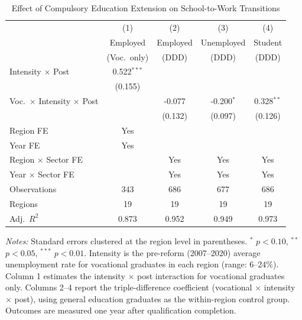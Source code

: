\begin{table}[H]
\centering
\caption{Effect of Compulsory Education Extension on School-to-Work Transitions}
\label{tab:main}
\begin{threeparttable}
\begin{tabular}{lcccc}
\toprule
 & (1) & (2) & (3) & (4) \\
 & Employed & Employed & Unemployed & Student \\
 & (Voc.~only) & (DDD) & (DDD) & (DDD) \\
\midrule
Intensity $\times$ Post & 0.522$^{***}$ & & & \\
 & (0.155) & & & \\
\addlinespace
Voc.~$\times$ Intensity $\times$ Post & & -0.077 & -0.200$^{*}$ & 0.328$^{**}$ \\
 & & (0.132) & (0.097) & (0.126) \\
\addlinespace
\midrule
Region FE & Yes & & & \\
Year FE & Yes & & & \\
Region $\times$ Sector FE & & Yes & Yes & Yes \\
Year $\times$ Sector FE & & Yes & Yes & Yes \\
Observations & 343 & 686 & 677 & 686 \\
Regions & 19 & 19 & 19 & 19 \\
Adj.~$R^2$ & 0.873 & 0.952 & 0.949 & 0.973 \\
\bottomrule
\end{tabular}
\begin{tablenotes}[flushleft]
\small
\item \textit{Notes:} Standard errors clustered at the region level in parentheses. $^{*}$ $p<0.10$, $^{**}$ $p<0.05$, $^{***}$ $p<0.01$. Intensity is the pre-reform (2007--2020) average unemployment rate for vocational graduates in each region (range: 6--24\%). Column 1 estimates the intensity $\times$ post interaction for vocational graduates only. Columns 2--4 report the triple-difference coefficient (vocational $\times$ intensity $\times$ post), using general education graduates as the within-region control group. Outcomes are measured one year after qualification completion.
\end{tablenotes}
\end{threeparttable}
\end{table}


